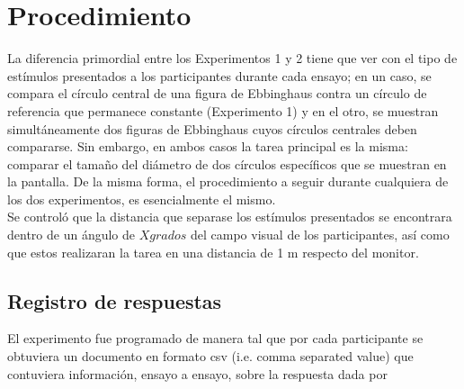\section{Procedimiento}

La diferencia primordial entre los Experimentos 1 y 2 tiene que ver con el tipo de estímulos presentados a los participantes durante cada ensayo; en un caso, se compara el círculo central de una figura de Ebbinghaus contra un círculo de referencia que permanece constante (Experimento 1) y en el otro, se muestran simultáneamente dos figuras de Ebbinghaus cuyos círculos centrales deben compararse. Sin embargo, en ambos casos la tarea principal es la misma: comparar el tamaño del diámetro de dos círculos específicos que se muestran en la pantalla. De la misma forma, el procedimiento a seguir durante cualquiera de los dos experimentos, es esencialmente el mismo.\\



Se controló que la distancia que separase los estímulos presentados se encontrara dentro de un ángulo de $X grados$ del campo visual de los participantes, así como que estos realizaran la tarea en una distancia de 1 m respecto del monitor.



\subsection{Registro de respuestas}

El experimento fue programado de manera tal que por cada participante se obtuviera un documento en formato csv (i.e. comma separated value) que contuviera información, ensayo a ensayo, sobre la respuesta dada por 
